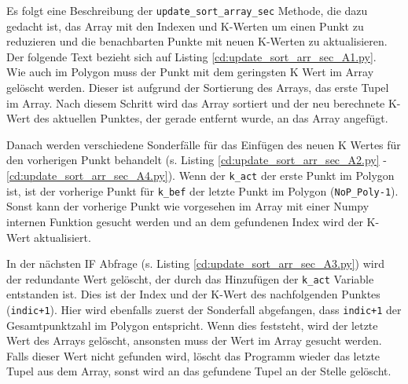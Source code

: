 {	Es folgt eine Beschreibung der \lstinline|update_sort_array_sec| Methode, die dazu gedacht ist, das Array mit den Indexen und K-Werten um einen Punkt zu reduzieren und die benachbarten Punkte mit neuen K-Werten zu aktualisieren. \ifimportant Der folgende Text bezieht sich auf Listing \ref{cd:update_sort_arr_sec_A1.py}. \fi \\
	Wie auch im Polygon muss der Punkt mit dem geringsten K Wert im Array gelöscht werden. Dieser ist aufgrund der Sortierung des Arrays, das erste Tupel im Array. Nach diesem Schritt wird das Array sortiert und der neu berechnete K-Wert des aktuellen Punktes, der gerade entfernt wurde, an das Array angefügt. \\
	\ifimportant
	
	\fi Danach werden verschiedene Sonderfälle für das Einfügen des neuen K Wertes für den vorherigen Punkt behandelt \ifimportant (s. Listing \ref{cd:update_sort_arr_sec_A2.py} - \ref{cd:update_sort_arr_sec_A4.py})\fi. Wenn der \lstinline|k_act| der erste Punkt im Polygon ist, ist der vorherige Punkt für \lstinline|k_bef| der letzte Punkt im Polygon (\lstinline|NoP_Poly-1|). Sonst kann der vorherige Punkt wie vorgesehen im Array mit einer Numpy internen Funktion gesucht werden und an dem gefundenen Index wird der K-Wert aktualisiert. \\
	\ifimportant
	
	\fi In der nächsten IF Abfrage \ifimportant (s. Listing \ref{cd:update_sort_arr_sec_A3.py}) \fi wird der redundante Wert gelöscht, der durch das Hinzufügen der \lstinline|k_act| Variable entstanden ist. Dies ist der Index und der K-Wert des nachfolgenden Punktes (\lstinline|indic+1|). Hier wird ebenfalls zuerst der Sonderfall abgefangen, dass \lstinline|indic+1| der Gesamtpunktzahl im Polygon entspricht. Wenn dies feststeht, wird der letzte Wert des Arrays gelöscht, ansonsten muss der Wert im Array gesucht werden. Falls dieser Wert nicht gefunden wird, löscht das Programm wieder das letzte Tupel aus dem Array, sonst wird an das gefundene Tupel an der Stelle gelöscht.
	\ifimportant
	
}
